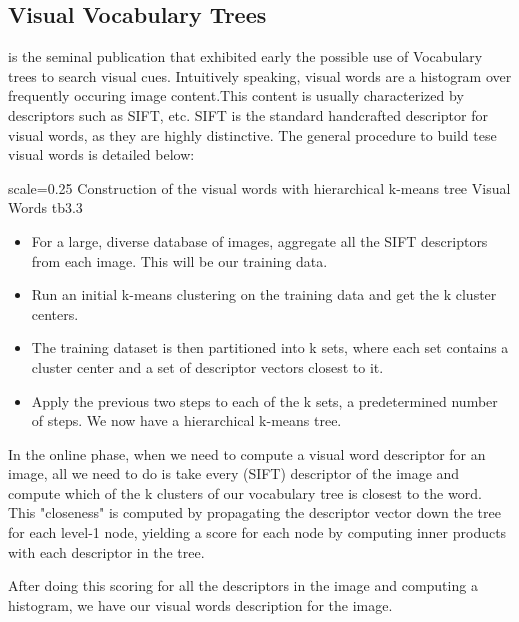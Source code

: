 \subsection{Visual Vocabulary Trees} %

\cite{Nister2006} is the seminal publication that exhibited early the possible use of Vocabulary trees to search visual cues. Intuitively speaking, visual words are a histogram over frequently occuring image content.This content is usually characterized by descriptors such as SIFT, etc.
SIFT is the standard handcrafted descriptor for visual words, as they are highly distinctive. The general procedure to build tese visual words is detailed below:

{scale=0.25}%
{Construction of the visual words with hierarchical k-means tree}%
{Visual Words}%
{tb3.3} %

\begin{itemize}
	\item For a large, diverse database of images, aggregate all the SIFT descriptors from each image. This will be our training data.\\
	\item Run an initial k-means clustering on the training data and get the k cluster centers.\\
	\item The training dataset is then partitioned into k sets, where each set contains a cluster center and a set of descriptor vectors closest to it.\\
	\item Apply the previous two steps to each of the k sets, a predetermined number of steps. We now have a hierarchical k-means tree.\\
\end{itemize}

In the online phase, when we need to compute a visual word descriptor for an image, all we need to do is take every (SIFT) descriptor of the image and compute 
which of the k clusters of our vocabulary tree is closest to the word. This "closeness" is computed by propagating the descriptor vector down the tree for each 
level-1 node, yielding a score for each node by computing inner products with each descriptor in the tree.

After doing this scoring for all the descriptors in the image and computing a histogram, we have our visual words description for the image. 

